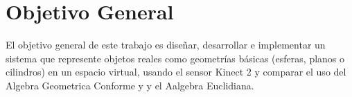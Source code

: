 \section{Objetivo General}

    El objetivo general de este trabajo es diseñar, desarrollar e implementar un sistema que represente objetos reales como geometrías básicas (\glspl{esfera}, \glspl{plano} o \glspl{cilindro}) en un espacio virtual, usando el sensor Kinect 2 y comparar el uso del Algebra Geometrica Conforme y  y el Aalgebra Euclidiana.\\